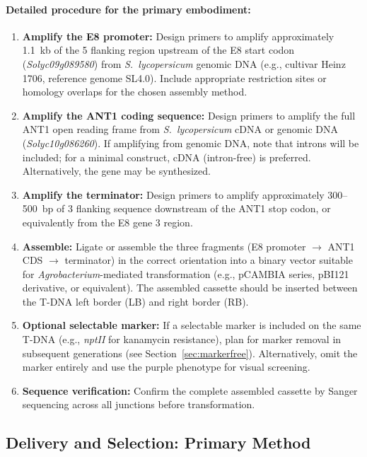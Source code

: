 \documentclass[12pt,a4paper]{article}
\begin{document}
\paragraph{Detailed procedure for the primary embodiment:}
\begin{enumerate}
  \item \textbf{Amplify the E8 promoter:} Design primers to amplify approximately 1.1~kb of the 5\textquotesingle{} flanking region upstream of the E8 start codon (\textit{Solyc09g089580}) from \textit{S.~lycopersicum} genomic DNA (e.g., cultivar Heinz 1706, reference genome SL4.0). Include appropriate restriction sites or homology overlaps for the chosen assembly method.
  \item \textbf{Amplify the ANT1 coding sequence:} Design primers to amplify the full ANT1 open reading frame from \textit{S.~lycopersicum} cDNA or genomic DNA (\textit{Solyc10g086260}). If amplifying from genomic DNA, note that introns will be included; for a minimal construct, cDNA (intron-free) is preferred. Alternatively, the gene may be synthesized.
  \item \textbf{Amplify the terminator:} Design primers to amplify approximately 300--500~bp of 3\textquotesingle{} flanking sequence downstream of the ANT1 stop codon, or equivalently from the E8 gene 3\textquotesingle{} region.
  \item \textbf{Assemble:} Ligate or assemble the three fragments (E8 promoter $\rightarrow$ ANT1 CDS $\rightarrow$ terminator) in the correct orientation into a binary vector suitable for \textit{Agrobacterium}-mediated transformation (e.g., pCAMBIA series, pBI121 derivative, or equivalent). The assembled cassette should be inserted between the T-DNA left border (LB) and right border (RB).
  \item \textbf{Optional selectable marker:} If a selectable marker is included on the same T-DNA (e.g., \textit{nptII} for kanamycin resistance), plan for marker removal in subsequent generations (see Section~\ref{sec:markerfree}). Alternatively, omit the marker entirely and use the purple phenotype for visual screening.
  \item \textbf{Sequence verification:} Confirm the complete assembled cassette by Sanger sequencing across all junctions before transformation.
\end{enumerate}

\subsection{Delivery and Selection: Primary Method}
\end{document}
